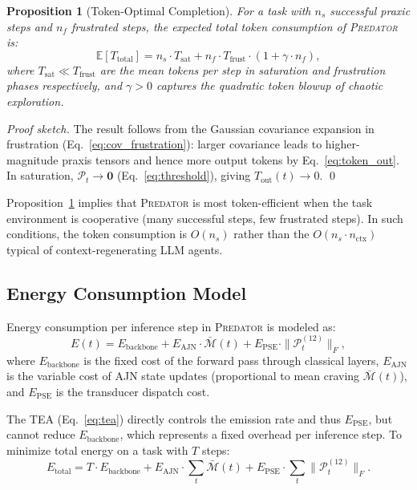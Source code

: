 \documentclass[12pt,a4paper]{article}
\newtheorem{proposition}{Proposition}[section]
\newcommand{\E}{\mathbb{E}}
\newcommand{\PREDATOR}{\textsc{Predator}}
\begin{document}
\begin{proposition}[Token-Optimal Completion]
\label{prop:token_opt}
For a task with $n_s$ successful praxic steps and $n_f$ frustrated steps, the
expected total token consumption of \PREDATOR{} is:
\begin{equation}
  \E[T_{\text{total}}] = n_s \cdot T_{\text{sat}} +
    n_f \cdot T_{\text{frust}} \cdot (1 + \gamma \cdot n_f),
  \label{eq:token_total}
\end{equation}
where $T_{\text{sat}} \ll T_{\text{frust}}$ are the mean tokens per step in
saturation and frustration phases respectively, and $\gamma > 0$ captures the
quadratic token blowup of chaotic exploration.
\end{proposition}

\begin{proof}[Proof sketch]
The result follows from the Gaussian covariance expansion in frustration
(Eq.~\ref{eq:cov_frustration}): larger covariance leads to higher-magnitude
praxis tensors and hence more output tokens by Eq.~\eqref{eq:token_out}. In
saturation, $\mathcal{P}_t \to \mathbf{0}$ (Eq.~\ref{eq:threshold}), giving
$T_{\text{out}}(t) \to 0$. \qed
\end{proof}

Proposition~\ref{prop:token_opt} implies that \PREDATOR{} is most
token-efficient when the task environment is cooperative (many successful
steps, few frustrated steps). In such conditions, the token consumption is
$O(n_s)$ rather than the $O(n_s \cdot n_{\text{ctx}})$ typical of
context-regenerating LLM agents.

\subsection{Energy Consumption Model}

Energy consumption per inference step in \PREDATOR{} is modeled as:
\begin{equation}
  E(t) = E_{\text{backbone}} +
    E_{\text{AJN}} \cdot \bar{\mathcal{M}}(t) +
    E_{\text{PSE}} \cdot \|\mathcal{P}_t^{(12)}\|_F,
  \label{eq:energy}
\end{equation}
where $E_{\text{backbone}}$ is the fixed cost of the forward pass through
classical layers, $E_{\text{AJN}}$ is the variable cost of AJN state updates
(proportional to mean craving $\bar{\mathcal{M}}(t)$), and $E_{\text{PSE}}$
is the transducer dispatch cost.

The TEA (Eq.~\ref{eq:tea}) directly controls the emission rate and thus
$E_{\text{PSE}}$, but cannot reduce $E_{\text{backbone}}$, which represents
a fixed overhead per inference step. To minimize total energy on a task with
$T$ steps:
\begin{equation}
  E_{\text{total}} = T \cdot E_{\text{backbone}} +
    E_{\text{AJN}} \cdot \sum_t \bar{\mathcal{M}}(t) +
    E_{\text{PSE}} \cdot \sum_t \|\mathcal{P}_t^{(12)}\|_F.
  \label{eq:energy_total}
\end{equation}
\end{document}
